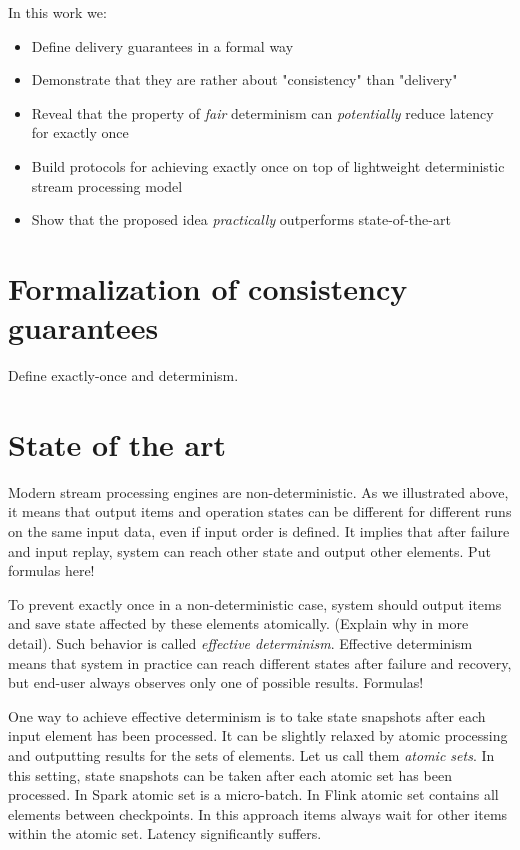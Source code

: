 \documentclass[sigconf]{acmart}
\theoremstyle{remark}
\begin{document}
In this work we:
\begin{itemize}
    \item Define delivery guarantees in a formal way
    \item Demonstrate that they are rather about "consistency" than "delivery"
    \item Reveal that the property of {\em fair} determinism can  {\em potentially} reduce latency for exactly once
    \item Build protocols for achieving exactly once on top of lightweight deterministic stream processing model 
    \item Show that the proposed idea {\em practically} outperforms state-of-the-art 
\end{itemize}

\section{Formalization of consistency guarantees}

Define exactly-once and determinism.

\section{State of the art}

Modern stream processing engines are non-deterministic. As we illustrated above, it means that output items and operation states can be different for different runs on the same input data, even if input order is defined. It implies that after failure and input replay, system can reach other state and output other elements. Put formulas here!

To prevent exactly once in a non-deterministic case, system should output items and save state affected by these elements atomically. (Explain why in more detail). Such behavior is called {\em effective determinism}. Effective determinism means that system in practice can reach different states after failure and recovery, but end-user always observes only one of possible results. Formulas! 

One way to achieve effective determinism is to take state snapshots after each input element has been processed. It can be slightly relaxed by atomic processing and outputting results for the sets of elements. Let us call them {\em atomic sets}. In this setting, state snapshots can be taken after each atomic set has been processed. In Spark atomic set is a micro-batch. In Flink atomic set contains all elements between checkpoints. In this approach items always wait for other items within the atomic set. Latency significantly suffers.    
\end{document}
